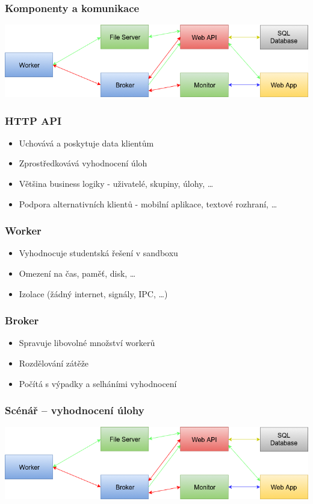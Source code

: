 \documentclass{beamer}
\begin{document}
\begin{frame}
	\frametitle{Komponenty a komunikace}
	\begin{center}
		\includegraphics[width=1\textwidth]{images/communication.png}
	\end{center}
\end{frame}

\begin{frame}
	\frametitle{HTTP API}
	\begin{itemize}
		\item Uchovává a poskytuje data klientům
		\item Zprostředkovává vyhodnocení úloh
		\item Většina business logiky - uživatelé, skupiny, úlohy, \dots
		\item Podpora alternativních klientů - mobilní aplikace, textové rozhraní, \dots
	\end{itemize}
\end{frame}

\begin{frame}
	\frametitle{Worker}
	\begin{itemize}
		\item Vyhodnocuje studentská řešení v sandboxu
		\item Omezení na čas, paměť, disk, \dots
		\item Izolace (žádný internet, signály, IPC, \dots)
	\end{itemize}
\end{frame}

\begin{frame}
	\frametitle{Broker}
	\begin{itemize}
		\item Spravuje libovolné množství workerů
		\item Rozdělování zátěže
		\item Počítá s výpadky a selháními vyhodnocení
	\end{itemize}
\end{frame}

\begin{frame}
	\frametitle{Scénář -- vyhodnocení úlohy}
	\begin{center}
		\includegraphics[width=1\textwidth]{images/communication.png}
	\end{center}
\end{frame}
\end{document}
